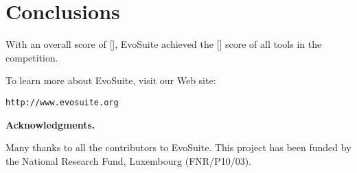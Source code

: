 \documentclass[10pt,conference,compsocconf]{IEEEtran}
\newcommand{\EVOSUITE}{{\sc EvoSuite}\xspace}
\begin{document}
\section{Conclusions}

With an overall score of [], \EVOSUITE achieved the []
 score of all tools in the competition. 


To learn more about \EVOSUITE, visit our Web site:
\begin{center}
\texttt{http://www.evosuite.org}
\end{center}



\textbf{Acknowledgments.} 

Many thanks to all the contributors to \EVOSUITE.
This project has been funded by 
the National Research Fund, Luxembourg (FNR/P10/03).


\def\IEEEbibitemsep{6pt}



\end{document}
